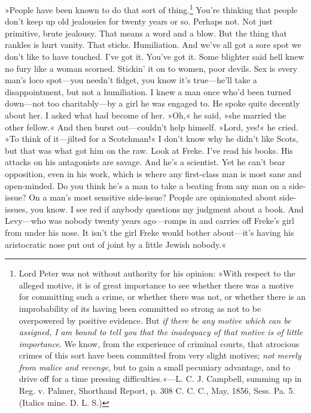 »People have been known to do that sort of thing.\footnote{Lord Peter was not without authority for his opinion: »With respect to the alleged motive, it is of great importance to see whether there was a motive for committing such a crime, or whether there was not, or whether there is an improbability of its having been committed so strong as not to be overpowered by positive evidence. But \textit{if there be any motive which can be assigned, I am bound to tell you that the inadequacy of that motive is of little importance}. We know, from the experience of criminal courts, that atrocious crimes of this sort have been committed from very slight motives; \textit{not merely from malice and revenge}, but to gain a small pecuniary advantage, and to drive off for a time pressing difficulties.«—L. C. J. Campbell, summing up in Reg. v. Palmer, Shorthand Report, p. 308 C. C. C., May, 1856, Sess. Pa. 5. (Italics mine. D. L. S.)}	You're thinking that people don't keep up old jealousies for twenty years or so. Perhaps not. Not just primitive, brute jealousy. That means a word and a blow. But the thing that rankles is hurt vanity. That sticks. Humiliation. And we've all got a sore spot we don't like to have touched. I've got it. You've got it. Some blighter said hell knew no fury like a woman scorned. Stickin' it on to women, poor devils. Sex is every man's loco spot\allowbreak---\allowbreak you needn't fidget, you know it's true\allowbreak---\allowbreak he'll take a disappointment, but not a humiliation. I knew a man once who'd been turned down\allowbreak---\allowbreak not too charitably\allowbreak---\allowbreak by a girl he was engaged to. He spoke quite decently about her. I asked what had become of her. »Oh,« he said, »she married the other fellow.« And then burst out\allowbreak---\allowbreak couldn't help himself. »Lord, yes!« he cried. »To think of it\allowbreak---\allowbreak jilted for a Scotchman!« I don't know why he didn't like Scots, but that was what got him on the raw. Look at Freke. I've read his books. His attacks on his antagonists are savage. And he's a scientist. Yet he can't bear opposition, even in his work, which is where any first-class man is most sane and open-minded. Do you think he's a man to take a beating from any man on a side-issue? On a man's most sensitive side-issue? People are opinionated about side-issues, you know. I see red if anybody questions my judgment about a book. And Levy\allowbreak---\allowbreak who was nobody twenty years ago\allowbreak---\allowbreak romps in and carries off Freke's girl from under his nose. It isn't the girl Freke would bother about\allowbreak---\allowbreak it's having his aristocratic nose put out of joint by a little Jewish nobody.«

